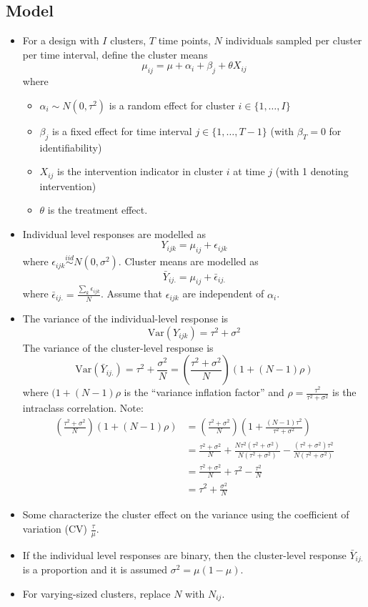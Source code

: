 \documentclass{article}
\newcommand{\Var}{\mathrm{Var}}
\begin{document}
\subsection{Model}

\begin{itemize}

\item
For a design with $I$ clusters, $T$ time points, $N$ individuals sampled per cluster per time interval, define the cluster means
\[
\mu_{ij} = \mu + \alpha_i + \beta_j + \theta X_{ij}
\]
where
\begin{itemize}
\item
$\alpha_i\sim N(0,\tau^2)$ is a random effect for cluster $i\in \{1,\ldots,I\}$
\item
$\beta_j$ is a fixed effect for time interval $j\in \{1,\ldots,T-1\}$ (with $\beta_T=0$ for identifiability)
\item
$X_{ij}$ is the intervention indicator in cluster $i$ at time $j$ (with 1 denoting intervention)
\item
$\theta$ is the treatment effect.
\end{itemize}

\item
Individual level responses are modelled as
\[
Y_{ijk} = \mu_{ij} + \epsilon_{ijk}
\]
where $\epsilon_{ijk}\overset{iid}{\sim} N(0,\sigma^2)$. Cluster means are modelled as
\[
\bar{Y}_{ij.} = \mu_{ij} + \bar{\epsilon}_{ij.}
\]
where $\bar{\epsilon}_{ij.} = \frac{\sum_k\epsilon_{ijk}}{N}$. Assume that $\epsilon_{ijk}$ are independent of $\alpha_i$.

\item
The variance of the individual-level response is
\[
\Var(Y_{ijk}) = \tau^2 + \sigma^2
\]
The variance of the cluster-level response is
\[
\Var(\bar{Y}_{ij.}) = \tau^2 + \frac{\sigma^2}{N} = \left(\frac{\tau^2+\sigma^2}{N}\right)(1+(N-1)\rho)
\]
where $(1+(N-1)\rho$ is the ``variance inflation factor'' and $\rho=\frac{\tau^2}{\tau^2+\sigma^2}$ is the intraclass correlation. Note:
\begin{align*}
\left(\frac{\tau^2+\sigma^2}{N}\right)(1+(N-1)\rho) &= \left(\frac{\tau^2+\sigma^2}{N}\right)\left(1+\frac{(N-1)\tau^2}{\tau^2+\sigma^2}\right) \\
&= \frac{\tau^2+\sigma^2}{N} + \frac{N\tau^2(\tau^2+\sigma^2)}{N(\tau^2+\sigma^2)} - \frac{(\tau^2+\sigma^2)\tau^2}{N(\tau^2+\sigma^2)} \\
&=  \frac{\tau^2+\sigma^2}{N} + \tau^2 - \frac{\tau^2}{N} \\
&= \tau^2 + \frac{\sigma^2}{N}
\end{align*}

\item
Some characterize the cluster effect on the variance using the coefficient of variation (CV) $\frac{\tau}{\mu}$.

\item
If the individual level responses are binary, then the cluster-level response $\bar{Y}_{ij.}$ is a proportion and it is assumed $\sigma^2=\mu(1-\mu)$.

\item
For varying-sized clusters, replace $N$ with $N_{ij}$.

\end{itemize}
\end{document}
